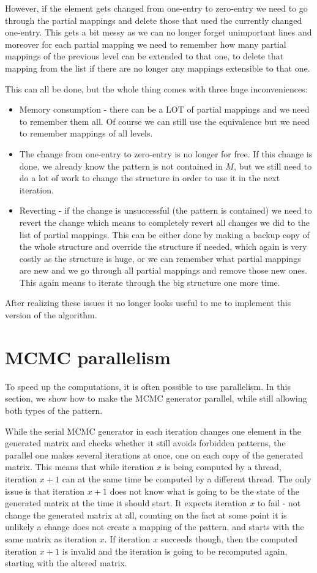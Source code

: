 However, if the element gets changed from one-entry to zero-entry we need to go through the partial mappings and delete those that used the currently changed one-entry. This gets a bit messy as we can no longer forget unimportant lines and moreover for each partial mapping we need to remember how many partial mappings of the previous level can be extended to that one, to delete that mapping from the list if there are no longer any mappings extensible to that one.

This can all be done, but the whole thing comes with three huge inconveniences:
\begin{itemize}
\item Memory consumption - there can be a LOT of partial mappings and we need to remember them all. Of course we can still use the equivalence but we need to remember mappings of all levels.
\item The change from one-entry to zero-entry is no longer for free. If this change is done, we already know the pattern is not contained in $M$, but we still need to do a lot of work to change the structure in order to use it in the next iteration.
\item Reverting - if the change is unsuccessful (the pattern is contained) we need to revert the change which means to completely revert all changes we did to the list of partial mappings. This can be either done by making a backup copy of the whole structure and override the structure if needed, which again is very costly as the structure is huge, or we can remember what partial mappings are new and we go through all partial mappings and remove those new ones. This again means to iterate through the big structure one more time.
\end{itemize}
After realizing these issues it no longer looks useful to me to implement this version of the algorithm.

\section{MCMC parallelism}
To speed up the computations, it is often possible to use parallelism. In this section, we show how to make the MCMC generator parallel, while still allowing both types of the pattern.

While the serial MCMC generator in each iteration changes one element in the generated matrix and checks whether it still avoids forbidden patterns, the parallel one makes several iterations at once, one on each copy of the generated matrix. This means that while iteration $x$ is being computed by a thread, iteration $x+1$ can at the same time be computed by a different thread. The only issue is that iteration $x+1$ does not know what is going to be the state of the generated matrix at the time it should start. It expects iteration $x$ to fail - not change the generated matrix at all, counting on the fact at some point it is unlikely a change does not create a mapping of the pattern, and starts with the same matrix as iteration $x$. If iteration $x$ succeeds though, then the computed iteration $x+1$ is invalid and the iteration is going to be recomputed again, starting with the altered matrix.

